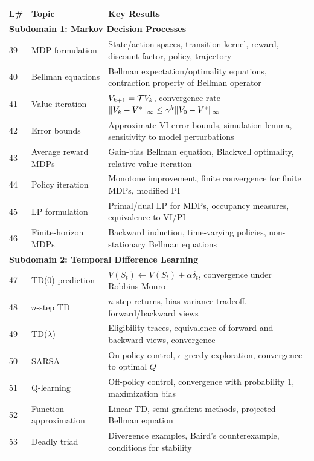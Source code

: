 \documentclass[11pt,a4paper]{article}
\begin{document}
\begin{center}
\small
\begin{tabular}{p{0.7cm}p{4.5cm}p{8cm}}
\toprule
\textbf{L\#} & \textbf{Topic} & \textbf{Key Results} \\
\midrule
\multicolumn{3}{l}{\textbf{Subdomain 1: Markov Decision Processes}} \\
\midrule
39 & MDP formulation & State/action spaces, transition kernel,
reward, discount factor, policy, trajectory \\
40 & Bellman equations & Bellman expectation/optimality equations,
contraction property of Bellman operator \\
41 & Value iteration & $V_{k+1} = \mathcal{T} V_k$, convergence rate
$\|V_k - V^*\|_\infty \leq \gamma^k \|V_0 - V^*\|_\infty$ \\
42 & Error bounds & Approximate VI error bounds, simulation lemma,
sensitivity to model perturbations \\
43 & Average reward MDPs & Gain-bias Bellman equation, Blackwell
optimality, relative value iteration \\
44 & Policy iteration & Monotone improvement, finite convergence for
finite MDPs, modified PI \\
45 & LP formulation & Primal/dual LP for MDPs, occupancy measures,
equivalence to VI/PI \\
46 & Finite-horizon MDPs & Backward induction, time-varying policies,
non-stationary Bellman equations \\
\midrule
\multicolumn{3}{l}{\textbf{Subdomain 2: Temporal Difference Learning}} \\
\midrule
47 & TD(0) prediction & $V(S_t) \leftarrow V(S_t) + \alpha \delta_t$,
convergence under Robbins-Monro \\
48 & $n$-step TD & $n$-step returns, bias-variance tradeoff,
forward/backward views \\
49 & TD($\lambda$) & Eligibility traces, equivalence of forward and
backward views, convergence \\
50 & SARSA & On-policy control, $\epsilon$-greedy exploration,
convergence to optimal $Q$ \\
51 & Q-learning & Off-policy control, convergence with probability 1,
maximization bias \\
52 & Function approximation & Linear TD, semi-gradient methods,
projected Bellman equation \\
53 & Deadly triad & Divergence examples, Baird's counterexample,
conditions for stability \\

\end{tabular}
\end{center}
\end{document}

